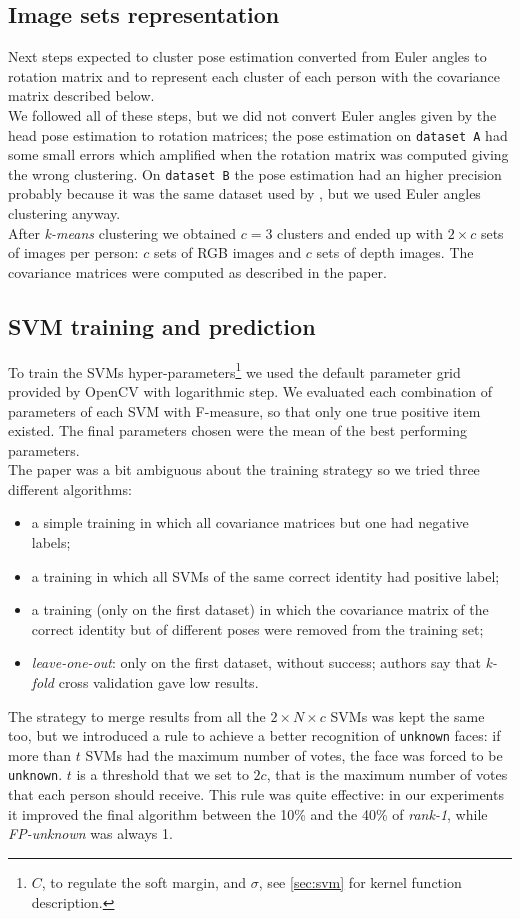 \documentclass{article}
\begin{document}
	\subsection{Image sets representation} \label{sec:covariances}
	Next steps expected to cluster pose estimation converted from Euler angles to rotation matrix and to represent each cluster of each person with the covariance matrix described below. \\
	We followed all of these steps, but we did not convert Euler angles given by the head pose estimation to rotation matrices; the pose estimation on \verb|dataset A| had some small errors which amplified when the rotation matrix was computed giving the wrong clustering. On \verb|dataset B| the pose estimation had an higher precision probably because it was the same dataset used by \citep{Fanelli2011}, but we used Euler angles clustering anyway.\\
	After \textit{k-means} clustering we obtained $c=3$ clusters and ended up with $2\times c$ sets of images per person: $c$ sets of RGB images and $c$ sets of depth images. The covariance matrices were computed as described in the paper.

	\subsection{SVM training and prediction} \label{sec:training}
	To train the SVMs hyper-parameters\footnote{$C$, to regulate the soft margin, and $\sigma$, see \ref{sec:svm} for kernel function description.} we used the default parameter grid provided by OpenCV with logarithmic step. We evaluated each combination of parameters of each SVM with F-measure, so that only one true positive item existed. The final parameters chosen were the mean of the best performing parameters. \\
	The paper was a bit ambiguous about the training strategy so we tried three different algorithms:
	\begin{itemize}
		\item a simple training in which all covariance matrices but one had negative labels;
		\item a training in which all SVMs of the same correct identity had positive label;
		\item a training (only on the first dataset) in which the covariance matrix of the correct identity but of different poses were removed from the training set;
		\item \textit{leave-one-out}: only on the first dataset, without success; authors say that \textit{k-fold} cross validation gave low results.
	\end{itemize}
	The strategy to merge results from all the $2 \times N \times c$ SVMs was kept the same too, but we introduced a rule to achieve a better recognition of \verb|unknown| faces: if more than $t$ SVMs had the maximum number of votes, the face was forced to be \verb|unknown|. $t$ is a threshold that we set to $2c$, that is the maximum number of votes that each person should receive. This rule was quite effective: in our experiments it improved the final algorithm between the 10\% and the 40\% of \textit{rank-1}, while \textit{FP-unknown} was always 1. \\
\end{document}
